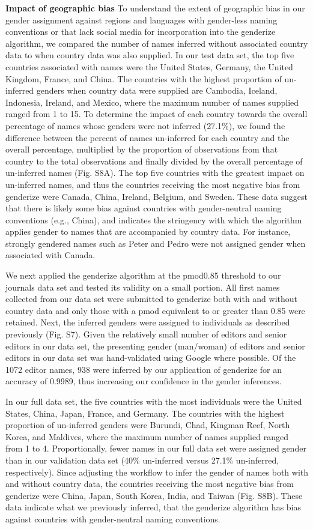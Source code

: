 \documentclass[11pt,]{article}
\begin{document}
\textbf{Impact of geographic bias} To understand the extent of
geographic bias in our gender assignment against regions and languages
with gender-less naming conventions or that lack social media for
incorporation into the genderize algorithm, we compared the number of
names inferred without associated country data to when country data was
also supplied. In our test data set, the top five countries associated
with names were the United States, Germany, the United Kingdom, France,
and China. The countries with the highest proportion of un-inferred
genders when country data were supplied are Cambodia, Iceland,
Indonesia, Ireland, and Mexico, where the maximum number of names
supplied ranged from 1 to 15. To determine the impact of each country
towards the overall percentage of names whose genders were not inferred
(27.1\%), we found the difference between the percent of names
un-inferred for each country and the overall percentage, multiplied by
the proportion of observations from that country to the total
observations and finally divided by the overall percentage of
un-inferred names (Fig. S8A). The top five countries with the greatest
impact on un-inferred names, and thus the countries receiving the most
negative bias from genderize were Canada, China, Ireland, Belgium, and
Sweden. These data suggest that there is likely some bias against
countries with gender-neutral naming conventions (e.g., China), and
indicates the stringency with which the algorithm applies gender to
names that are accompanied by country data. For instance, strongly
gendered names such as Peter and Pedro were not assigned gender when
associated with Canada.

We next applied the genderize algorithm at the pmod0.85 threshold to our
journals data set and tested its validity on a small portion. All first
names collected from our data set were submitted to genderize both with
and without country data and only those with a pmod equivalent to or
greater than 0.85 were retained. Next, the inferred genders were
assigned to individuals as described previously (Fig. S7). Given the
relatively small number of editors and senior editors in our data set,
the presenting gender (man/woman) of editors and senior editors in our
data set was hand-validated using Google where possible. Of the 1072
editor names, 938 were inferred by our application of genderize for an
accuracy of 0.9989, thus increasing our confidence in the gender
inferences.

In our full data set, the five countries with the most individuals were
the United States, China, Japan, France, and Germany. The countries with
the highest proportion of un-inferred genders were Burundi, Chad,
Kingman Reef, North Korea, and Maldives, where the maximum number of
names supplied ranged from 1 to 4. Proportionally, fewer names in our
full data set were assigned gender than in our validation data set (40\%
un-inferred versus 27.1\% un-inferred, respectively). Since adjusting
the workflow to infer the gender of names both with and without country
data, the countries receiving the most negative bias from genderize were
China, Japan, South Korea, India, and Taiwan (Fig. S8B). These data
indicate what we previously inferred, that the genderize algorithm has
bias against countries with gender-neutral naming conventions.
\end{document}
